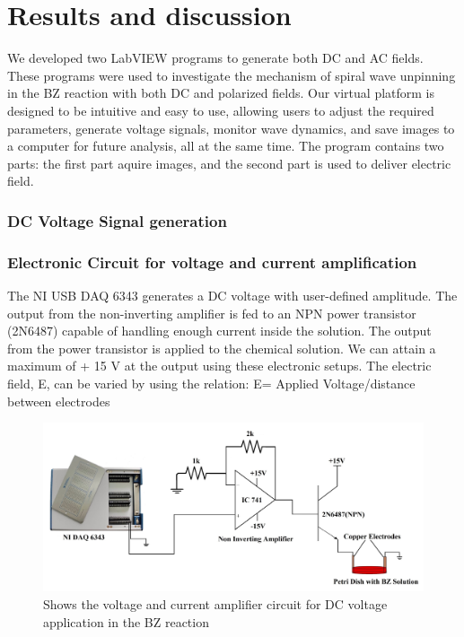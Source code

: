 \documentclass[journal=jacsat,manuscript=article]{achemso}
\begin{document}
\section{Results and discussion}
We developed two LabVIEW programs to generate both DC and AC
fields. These programs were used to investigate the mechanism of
spiral wave unpinning in the BZ reaction with both DC and polarized
fields.  Our virtual platform is designed to be
intuitive and easy to use, allowing users to adjust the required
parameters, generate voltage signals, monitor wave dynamics, and save
images to a computer for future analysis, all at the same time.
The program contains two parts: the first part aquire images,
and the second part is used to deliver electric field.
\subsubsection{DC Voltage Signal generation}
\subsubsection{Electronic Circuit for voltage and current amplification}
The NI USB DAQ 6343 generates a DC voltage with user-defined
amplitude. The output from the non-inverting amplifier is fed to an
NPN power transistor (2N6487) capable of handling enough current
inside the solution. The output from the power transistor is applied
to the chemical solution. We can attain a maximum of + 15 V at the
output using these electronic setups. The electric field, E, can be
varied by using the relation: E= Applied Voltage/distance between
electrodes
\begin{figure}[H]
    \centering
    \includegraphics[width=\linewidth]{pulse circuit - Copy.jpg}
    \caption{Shows the voltage and current amplifier circuit for DC
      voltage application in the BZ reaction}
    \label{fig:ex2}
\end{figure}
\end{document}
